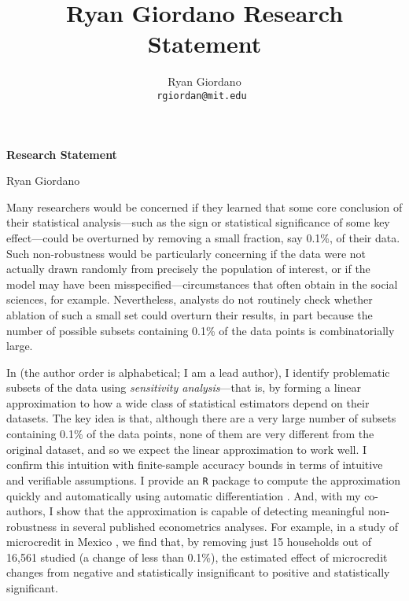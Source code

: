 
\usepackage{enumitem}

\usepackage{geometry}
\geometry{top=0.8in}
\geometry{left=1.2in}
\geometry{right=1.2in}

\title{Ryan Giordano Research Statement}

\author{
  Ryan Giordano \\ \texttt{rgiordan@mit.edu }
}



\begin{minipage}[t]{0.5\textwidth}
\hspace{-2em} %
{\bf \LARGE Research Statement}\\
\end{minipage}
\begin{minipage}[t]{0.5\textwidth}
        \hspace{8em} %
        {\LARGE Ryan Giordano}
\end{minipage}

Many researchers would be concerned if they learned that some core conclusion of
their statistical analysis---such as the sign or statistical significance of some
key effect---could be overturned by removing a small fraction, say 0.1\%, of
their data.  Such non-robustness would be particularly concerning if the data
were not actually drawn randomly from precisely the population of interest, or if
the model may have been misspecified---circumstances that often obtain in  the
social sciences, for example.  Nevertheless, analysts do not routinely check
whether ablation of such a small set could overturn their results, in part
because the number of possible subsets containing 0.1\% of the data points is
combinatorially large.

In \citet{giordano:2020:amip} (the author order is alphabetical; I am a lead
author), I identify problematic subsets of the data using {\em sensitivity
analysis}---that is, by forming a linear approximation to how a wide class of
statistical estimators depend on their datasets.  The key idea is that, although
there are a very large number of subsets containing 0.1\% of the data points,
none of them are very different from the original dataset, and so we expect the
linear approximation to work well.  I confirm this intuition with finite-sample
accuracy bounds in terms of intuitive and verifiable assumptions.  I provide an
\texttt{R} package \citep{zaminfluence} to compute the approximation quickly and
automatically using automatic differentiation \citep{baydin:2015:automatic,
autograd}.  And, with my co-authors, I show that the approximation is capable of
detecting meaningful non-robustness in several published econometrics analyses.
For example, in a study of microcredit in Mexico
\citep{angelucci:2015:microcredit}, we find that, by removing just 15 households
out of 16,561 studied (a change of less than 0.1\%), the estimated effect of
microcredit changes from negative and statistically insignificant to positive
and statistically significant.

